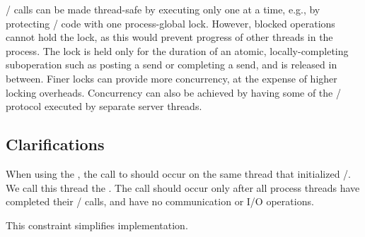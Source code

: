 \begin{implementors}
\MPI/ calls can be made thread-safe by executing only one at a time,
e.g., by protecting \MPI/ code with one process-global lock.  However,
blocked
operations cannot hold the lock, as this would prevent progress of
other threads in the process.  The
lock is held only for the duration of an atomic, locally-completing
suboperation such as posting a send or completing a send, and is released
in between.
Finer locks can provide more concurrency, at the expense of higher
locking overheads.
Concurrency can also be achieved by having some of the \MPI/ protocol
executed by separate server threads.
\end{implementors}
\subsection{Clarifications}
\label{sec:dynamic:threads:clarifications}

When using the \wpm{}\mpitermindex{\wpm}, the call to  should occur on the same thread
that
initialized \MPI/. We call this thread the .  The call should occur only after all process threads
have completed their \MPI/ calls, and have no 
communication or I/O operations.
\begin{rationale}
This constraint simplifies implementation.
\end{rationale}


